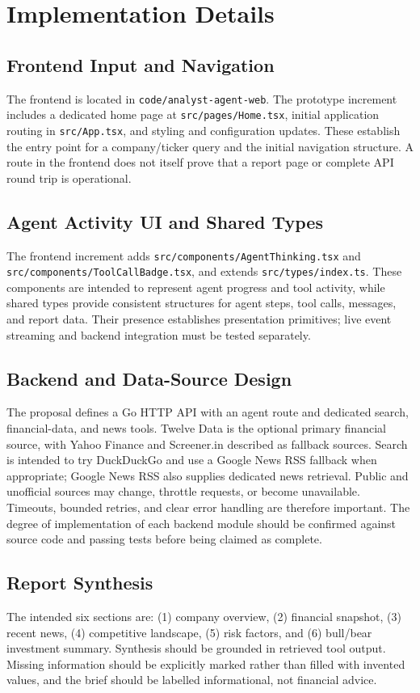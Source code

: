 \documentclass[12pt,a4paper,oneside]{report}
\begin{document}
\section{Implementation Details}
\subsection{Frontend Input and Navigation}
The frontend is located in \texttt{code/analyst-agent-web}. The prototype increment includes a dedicated home page at \texttt{src/pages/Home.tsx}, initial application routing in \texttt{src/App.tsx}, and styling and configuration updates. These establish the entry point for a company/ticker query and the initial navigation structure. A route in the frontend does not itself prove that a report page or complete API round trip is operational.

\subsection{Agent Activity UI and Shared Types}
The frontend increment adds \texttt{src/components/AgentThinking.tsx} and \texttt{src/components/ToolCallBadge.tsx}, and extends \texttt{src/types/index.ts}. These components are intended to represent agent progress and tool activity, while shared types provide consistent structures for agent steps, tool calls, messages, and report data. Their presence establishes presentation primitives; live event streaming and backend integration must be tested separately.

\subsection{Backend and Data-Source Design}
The proposal defines a Go HTTP API with an agent route and dedicated search, financial-data, and news tools. Twelve Data is the optional primary financial source, with Yahoo Finance and Screener.in described as fallback sources. Search is intended to try DuckDuckGo and use a Google News RSS fallback when appropriate; Google News RSS also supplies dedicated news retrieval. Public and unofficial sources may change, throttle requests, or become unavailable. Timeouts, bounded retries, and clear error handling are therefore important. The degree of implementation of each backend module should be confirmed against source code and passing tests before being claimed as complete.

\subsection{Report Synthesis}
The intended six sections are: (1) company overview, (2) financial snapshot, (3) recent news, (4) competitive landscape, (5) risk factors, and (6) bull/bear investment summary. Synthesis should be grounded in retrieved tool output. Missing information should be explicitly marked rather than filled with invented values, and the brief should be labelled informational, not financial advice.
\end{document}
